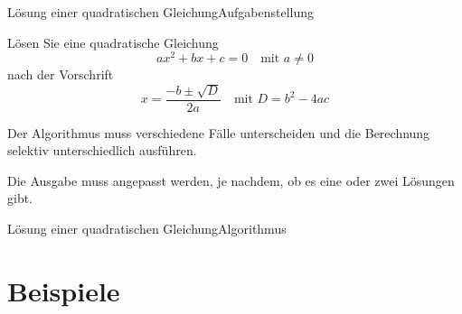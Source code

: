 \documentclass[xelatex,aspectratio=169]{beamer}
\begin{document}
\begin{frame}{Lösung einer quadratischen Gleichung}{Aufgabenstellung}

  Lösen Sie eine quadratische Gleichung
  \[
    ax^2 + bx + c = 0 \quad \text{mit } a \neq 0
  \]
  nach der Vorschrift
  \[
    x = \frac{-b \pm \sqrt{D}}{2a} \quad \text{mit } D = b^2 - 4ac
  \]

  Der Algorithmus muss verschiedene Fälle unterscheiden und die Berechnung selektiv unterschiedlich ausführen.

  Die Ausgabe muss angepasst werden, je nachdem, ob es eine oder zwei Lösungen gibt.
\end{frame}

\begin{frame}{Lösung einer quadratischen Gleichung}{Algorithmus}
\end{frame}

\section{Beispiele}

\end{document}

